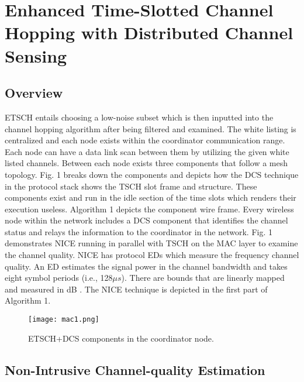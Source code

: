 \documentclass[acmsmall, authorversion]{acmart}
\begin{document}
\section{Enhanced Time-Slotted Channel Hopping with Distributed Channel Sensing}

\subsection{Overview}
ETSCH entails choosing a low-noise subset which is then inputted into the channel hopping algorithm after being filtered and examined. The white listing is centralized and each node exists within the coordinator communication range. Each node can have a data link scan between them by utilizing the given white listed channels. Between each node exists  three components that follow a mesh topology. Fig. 1 breaks down the components and depicts how the DCS technique in the protocol stack shows the TSCH slot frame and structure. These components exist and run in the idle section of the time slots which renders their execution useless. Algorithm 1 depicts the component wire frame. Every wireless node within the network includes a DCS component that identifies the channel status and relays the information to the coordinator in the network. Fig. 1 demonstrates NICE running in parallel with TSCH on the MAC layer to examine the channel quality. NICE has protocol EDs which measure the frequency channel quality. An ED estimates the signal power in the channel bandwidth and takes eight symbol periods (i.e., 128$μs$). There are bounds that are linearly mapped and measured in dB \cite{chang}. The NICE technique is depicted in the first part of Algorithm 1.

\begin{figure*}[t]
\begin{multicols}
\centering
    \texttt{[image: mac1.png]}
    \caption{ETSCH+DCS components in the coordinator node.}
\end{multicols}
\end{figure*}

\begin{figure*}[t]
\begin{multicols}
\centering
    \texttt{[image: algofinal.png]}}
\end{multicols}
\end{figure*}

\subsection{Non-Intrusive Channel-quality Estimation}
\end{document}
